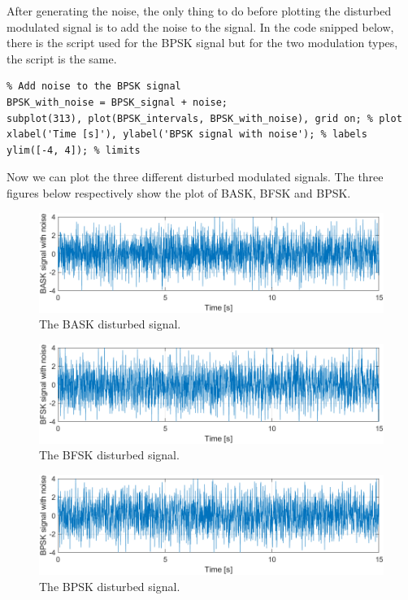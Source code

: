 \noindent After generating the noise, the only thing to do before plotting the disturbed modulated signal is to add the noise to the signal. In the code snipped below, there is the script used for the BPSK signal but for the two modulation types, the script is the same.

\begin{lstlisting}
% Add noise to the BPSK signal
BPSK_with_noise = BPSK_signal + noise;
subplot(313), plot(BPSK_intervals, BPSK_with_noise), grid on; % plot
xlabel('Time [s]'), ylabel('BPSK signal with noise'); % labels
ylim([-4, 4]); % limits
\end{lstlisting}

\noindent Now we can plot the three different disturbed modulated signals. The three figures below respectively show the plot of BASK, BFSK and BPSK.
\begin{figure}[!h]
    \centering
    \includegraphics[width = .7\textwidth]{lab-3/imgs/task3_BASK.png}
    \caption*{The BASK disturbed signal.}
\end{figure}
\vspace*{-15px}
\begin{figure}[!h]
    \centering
    \includegraphics[width = .7\textwidth]{lab-3/imgs/task3_BFSK.png}
    \caption*{The BFSK disturbed signal.}
\end{figure}
\vspace*{-15px}
\begin{figure}[!h]
    \centering
    \includegraphics[width = .7\textwidth]{lab-3/imgs/task3_BPSK.png}
    \caption*{The BPSK disturbed signal.}
\end{figure}
\vspace*{-15px}

